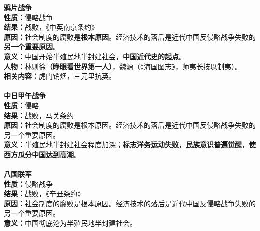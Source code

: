{\textbf{鸦片战争}}\\
\textbf{{性质：}}{侵略战争~~}\\
\textbf{{结果：}}{战败，《中英南京条约》~~}\\
\textbf{{原因：}}{社会制度的腐败是}\textbf{{{根本原因}}}{。经济技术的落后是近代中国反侵略战争失败的}\textbf{{{另一个重要原因}}}{。~~}\\
\textbf{{意义：}}{中国开始半殖民地半封建社会，}\textbf{{{中国近代史的起点}}}{。~~}\\
\textbf{{人物：}}{林则徐}\textbf{{{（睁眼看世界第一人）}}}{，魏源（《海国图志》，师夷长技以制夷）。~~}\\
\textbf{{相关内容：}}{虎门销烟，三元里抗英。~}\\
{~}\\
{\textbf{中日甲午战争}}{~}{~}\\
\textbf{{性质：}}{侵略~~}\\
\textbf{{结果：}}{战败，马关条约~~}\\
\textbf{{原因：}}{社会制度的腐败是根本原因。经济技术的落后是近代中国反侵略战争失败的另一个重要原因。~~}\\
\textbf{{意义：}}{半殖民地半封建社会程度加深；}\textbf{{{标志洋务运动失败}}}{，}\textbf{{{民族意识普遍觉醒}}}{，}\textbf{{{使西方瓜分中国达到高潮}}}{。~~}\\
{~~~}\\
{\textbf{八国联军}}{~~}\\
\textbf{{性质：}}{侵略战争~~}\\
\textbf{{结果：}}{战败，《辛丑条约》~~}\\
\textbf{{原因：}}{社会制度的腐败是根本原因。经济技术的落后是近代中国反侵略战争失败的另一个重要原因。~~}\\
\textbf{{意义：}}{中国彻底沦为半殖民地半封建社会。}
